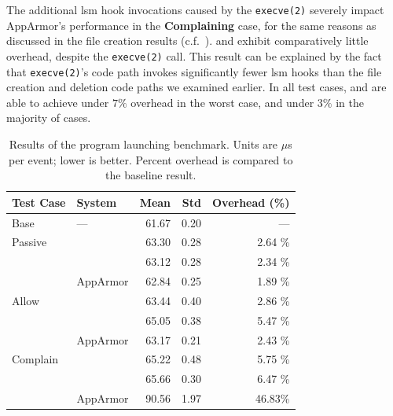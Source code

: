 The additional \gls{lsm} hook invocations caused by the \texttt{execve(2)} severely impact
AppArmor's performance in the \textbf{Complaining} case, for the same reasons as discussed
in the file creation results (c.f.~). \bpfbox{} and \bpfcontain{}
exhibit comparatively little overhead, despite the \texttt{execve(2)} call. This result
can be explained by the fact that \texttt{execve(2)}'s code path invokes significantly
fewer \gls{lsm} hooks than the file creation and deletion code paths we examined earlier.
In all test cases, \bpfbox{} and \bpfcontain{} are able to achieve under $7\%$ overhead in
the worst case, and under $3\%$ in the majority of cases.


\begingroup\small
\begin{longtable}[c]{llrrr}
  \caption[Results of the program launching benchmark]{
    Results of the program launching benchmark. Units are $\mu$s per event; lower is
    better. Percent overhead is compared to the baseline result.
  }%
  \label{tab:phoronix-launch-programs}\\
  \toprule
   Test Case & System         &  Mean & Std  & Overhead (\%)\\
   \midrule
   Base      & ---            & 61.67 & 0.20 & ---     \\
   \midrule
   Passive   & \bpfbox{}      & 63.30 & 0.28 & 2.64 \% \\
             & \bpfcontain{}  & 63.12 & 0.28 & 2.34 \% \\
             & AppArmor       & 62.84 & 0.25 & 1.89 \% \\
   \midrule
   Allow     & \bpfbox{}      & 63.44 & 0.40 & 2.86 \% \\
             & \bpfcontain{}  & 65.05 & 0.38 & 5.47 \% \\
             & AppArmor       & 63.17 & 0.21 & 2.43 \% \\
   \midrule
   Complain  & \bpfbox{}      & 65.22 & 0.48 & 5.75 \% \\
             & \bpfcontain{}  & 65.66 & 0.30 & 6.47 \% \\
             & AppArmor       & 90.56 & 1.97 & 46.83\% \\
  \bottomrule
\end{longtable}
\endgroup

